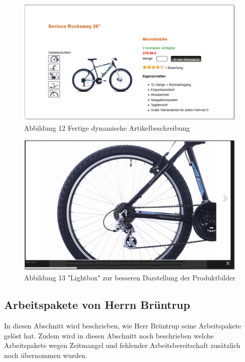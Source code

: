 \begin{figure}[H]
\begin{center}
\includegraphics[width=150mm]{Bilder/Abbildung12-DynamischeDetailierteArtikelbeschreibungFertig.png}
\end{center}
\caption{Abbildung 12 Fertige dynamische Artikelbeschreibung}
\label{Abbildung12-Fertige dynamische Artikelbeschreibung}
\end{figure}

\begin{figure}[H]
\begin{center}
\includegraphics[width=150mm]{Bilder/Abbildung13-Lightbox.png}
\end{center}
\caption{Abbildung 13 "Lightbox" zur besseren Darstellung der Produktbilder}
\label{Abbildung13-"Lightbox" zur besseren Darstellung der Produktbilder}
\end{figure}





\subsection{Arbeitspakete von Herrn Brüntrup}
In diesen Abschnitt wird beschrieben, wie Herr Brüntrup seine Arbeitspakete gelöst hat. Zudem wird in diesen Abschnitt noch beschrieben welche Arbeitspakete wegen Zeitmangel und fehlender Arbeitsbereitschaft zusätzlich noch übernommen wurden.

